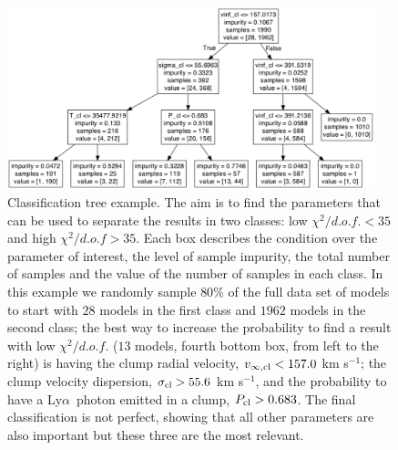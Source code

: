 \documentclass[a4,useAMS,usenatbib,usegraphicx]{mn2e}
\newcommand{\lya}{\ifmmode{{\rm Ly}\alpha}\else Ly$\alpha$\ \fi}
\newcommand{\kms}{km s$^{-1}$}
\begin{document}
\begin{figure}
\begin{center}
\includegraphics[width=0.95\textwidth]{tree_result.pdf}
\caption{Classification tree example. 
The aim is to find the parameters that can be used to separate the
results in two classes: low $\chi^2/d.o.f. < 35$ and high $\chi^2/d.o.f>35$. 
Each box describes the condition over the parameter of interest, the
level of sample impurity, the total number of samples and the value of the
number of samples in each class.  
In this example we randomly sample $80\%$ of the full data set of models to
start with $28$ models in the first class and
$1962$ models in the second class; the best way to increase the
probability to find a result with low $\chi^2/d.o.f.$ ($13$ models,
fourth bottom box, from left to the right)
is having the clump radial velocity, $v_{\infty,{\rm cl}}<157.0$ \kms;
the clump velocity dispersion, $\sigma_{{\rm cl}}>55.6$ \kms, and the
probability to have a \lya photon emitted in a clump, $P_{\rm cl}>0.683$.
The final classification is not perfect, showing that all other
parameters are also important but these three are the most relevant.  
\label{fig:tree}}
\end{center}
\end{figure}
\end{document}
